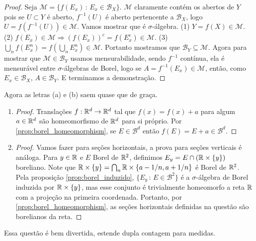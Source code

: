 \begin{proof}
    Seja $\mathcal{M} = \{f(E_x) \, : \, E_x \in \mathcal{B}_X\}$. $\mathcal{M}$ claramente contém
    os abertos de $Y$ pois se $U \subset Y$ é aberto, $f^{-1}(U)$ é aberto pertencente a $\mathcal{B}_X$, logo $U = f(f^{-1}(U)) \in \mathcal{M}$. Vamos mostrar que é $\sigma$-álgebra.
    (1) $Y = f(X) \in \mathcal{M}$. (2) $f(E_x) \in \mathcal{M} \Rightarrow (f(E_x))^c = f(E_x^c) \in \mathcal{M}$. (3) $\bigcup_n f(E_x^n) = f(\bigcup_n E_x^n) \in \mathcal{M}$. Portanto mostramos que $\mathcal{B}_Y \subseteq \mathcal{M}$. Agora para mostrar que $\mathcal{M} \in \mathcal{B}_Y$ usamos mensurabilidade, sendo $f^{-1}$ contínua, ela é mensurável entre $\sigma$-álgebras de Borel, logo se $A = f^{-1}(E_x) \in \mathcal{M}$, então, como $E_x \in \mathcal{B}_X$, $A \in \mathcal{B}_Y$. E terminamos a demonstração. 
\end{proof}
Agora as letras (a) e (b) saem quase que de graça.
\begin{enumerate}[label=(\alph*)]
    \item \begin{proof}
        Translações $f:\mathbb{R}^d \rightarrow \mathbb{R}^d$ tal que $f(x) = f(x) + a$ para algum $a \in \mathbb{R}^d$ são homeomorfismo de $\mathbb{R}^d$ para si próprio. Por \ref{prop:borel_homeomorphism}, se $E \in \mathcal{B}^d$ então $f(E) = E + a \in \mathcal{B}^d$.
    \end{proof}
    \item \begin{proof}
        Vamos fazer para seções horizontais, a prova para seções verticais é análoga.
        Para $y \in \mathbb{R}$ e $E$ Borel de $\mathbb{R}^2$, definimos $E_y = E \cap (\mathbb{R} \times \{y\})$ boreliano. Note que 
        $\mathbb{R} \times \{y\} = \bigcap_n \mathbb{R} \times \{a - 1/n, a + 1/n\}$ é Borel de $\mathbb{R}^2$. Pela proposição
        \ref{prop:borel_induzido}, $\{E_y \, : \, E \in \mathcal{B}^2\}$ é a $\sigma$-álgebra de Borel induzida por $\mathbb{R} \times \{y\}$, mas esse conjunto é trivialmente homeomorfo a reta $\mathbb{R}$ com 
        a projeção na primeira coordenada. Portanto, por \ref{prop:borel_homeomorphism}, as seções horizontais definidas na questão são borelianos da reta.
    \end{proof}
\end{enumerate}




\begin{problem}
    \label{prob:l1:6}
\end{problem}

Essa questão é bem divertida, estende dupla contagem para medidas.

